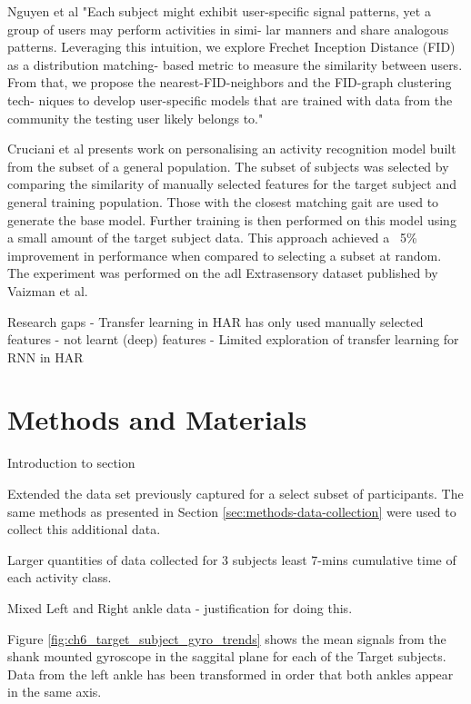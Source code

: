 Nguyen et al "Each subject might exhibit user-specific signal patterns, yet a group of users may perform activities in simi- lar manners and share analogous patterns. Leveraging this intuition, we explore Frechet Inception Distance (FID) as a distribution matching- based metric to measure the similarity between users. From that, we propose the nearest-FID-neighbors and the FID-graph clustering tech- niques to develop user-specific models that are trained with data from the community the testing user likely belongs to." \cite{Nguyen2021}


Cruciani et al presents work on personalising an activity recognition model built from the subset of a general population. The subset of subjects was selected by comparing the similarity of manually selected features for the target subject and general training population. Those with the closest matching gait are used to generate the base model. Further training is then performed on this model using a small amount of the target subject data. This approach achieved a ~5\% improvement in performance when compared to selecting a subset at random\cite{Cruciani2020}. The experiment was performed on the \acrshort{adl} Extrasensory dataset published by Vaizman et al\cite{Vaizman2017}.


Research gaps
- Transfer learning in HAR has only used manually selected features - not learnt (deep) features
- Limited exploration of transfer learning for RNN in HAR


\section{Methods and Materials}
\label{sec:personalistaion-methods}
Introduction to section

Extended the data set previously captured for a select subset of participants. The same methods as presented in Section \ref{sec:methods-data-collection} were used to collect this additional data.

Larger quantities of data collected for 3 subjects least 7-mins cumulative time of each activity class. 

Mixed Left and Right ankle data - justification for doing this.

Figure \ref{fig:ch6_target_subject_gyro_trends} shows the mean signals from the shank mounted gyroscope in the saggital plane for each of the Target subjects. Data from the left ankle has been transformed in order that both ankles appear in the same axis.

